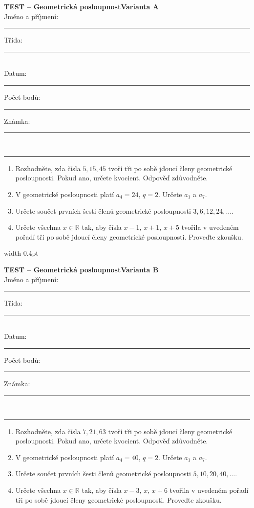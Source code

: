 \documentclass[a4paper,10pt,landscape]{article}
\newcommand{\TestTitle}{Geometrická posloupnost}
\newcommand{\TestHeader}[1]{%
    {\bfseries TEST -- \TestTitle}\hfill{\bfseries Varianta #1}\\[2mm]
    Jméno a příjmení: \rule{4.5cm}{0.4pt}\hfill Třída: \rule{1.5cm}{0.4pt}\\[2mm]
    Datum: \rule{2.4cm}{0.4pt}\hfill Počet bodů: \rule{1.4cm}{0.4pt}\hfill Známka: \rule{1.4cm}{0.4pt}\\[1mm]
    \hrule\vspace{3mm}
}
\newcommand{\AnswerSpace}[1]{\vspace{#1}}
\begin{document}
\noindent
\begin{minipage}[t]{0.48\textwidth}
    \small
    \TestHeader{A}

    \begin{enumerate}
        \item Rozhodněte, zda čísla $5,15,45$ tvoří tři po sobě jdoucí členy geometrické posloupnosti. Pokud ano, určete kvocient. Odpověď zdůvodněte.
        \AnswerSpace{18mm}
        \item V geometrické posloupnosti platí $a_4=24$, $q=2$. Určete $a_1$ a $a_7$.
        \AnswerSpace{25mm}
        \item Určete součet prvních šesti členů geometrické posloupnosti $3,6,12,24,\ldots$.
        \AnswerSpace{25mm}
        \item Určete všechna $x\in\mathbb R$ tak, aby čísla $x-1$, $x+1$, $x+5$ tvořila v uvedeném pořadí tři po sobě jdoucí členy geometrické posloupnosti. Proveďte zkoušku.
        \AnswerSpace{25mm}
    \end{enumerate}
\end{minipage}%
\hfill\vrule width 0.4pt\hfill
\begin{minipage}[t]{0.48\textwidth}
    \small
    \TestHeader{B}

    \begin{enumerate}
        \item Rozhodněte, zda čísla $7,21,63$ tvoří tři po sobě jdoucí členy geometrické posloupnosti. Pokud ano, určete kvocient. Odpověď zdůvodněte.
        \AnswerSpace{18mm}
        \item V geometrické posloupnosti platí $a_4=40$, $q=2$. Určete $a_1$ a $a_7$.
        \AnswerSpace{25mm}
        \item Určete součet prvních šesti členů geometrické posloupnosti $5,10,20,40,\ldots$.
        \AnswerSpace{25mm}
        \item Určete všechna $x\in\mathbb R$ tak, aby čísla $x-3$, $x$, $x+6$ tvořila v uvedeném pořadí tři po sobě jdoucí členy geometrické posloupnosti. Proveďte zkoušku.
        \AnswerSpace{25mm}
    \end{enumerate}
\end{minipage}
\end{document}
